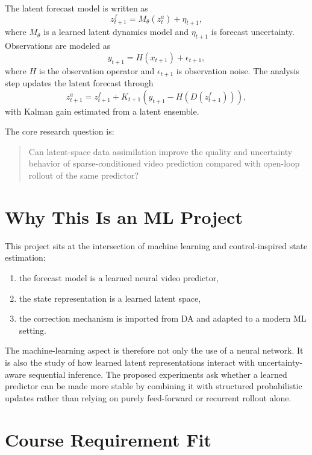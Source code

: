 \documentclass{article}
\begin{document}
The latent forecast model is written as
\begin{equation}
    z_{t+1}^{f} = M_{\theta}(z_t^{a}) + \eta_{t+1},
\end{equation}
where $M_{\theta}$ is a learned latent dynamics model and $\eta_{t+1}$ is forecast uncertainty. Observations are modeled as
\begin{equation}
    y_{t+1} = H(x_{t+1}) + \epsilon_{t+1},
\end{equation}
where $H$ is the observation operator and $\epsilon_{t+1}$ is observation noise. The analysis step updates the latent forecast through
\begin{equation}
    z_{t+1}^{a} = z_{t+1}^{f} + K_{t+1}\left(y_{t+1} - H(D(z_{t+1}^{f}))\right),
\end{equation}
with Kalman gain estimated from a latent ensemble.

The core research question is:
\begin{quote}
Can latent-space data assimilation improve the quality and uncertainty behavior of sparse-conditioned video prediction compared with open-loop rollout of the same predictor?
\end{quote}

\section{Why This Is an ML Project}

This project sits at the intersection of machine learning and control-inspired state estimation:
\begin{enumerate}[leftmargin=1.2em]
    \item the forecast model is a learned neural video predictor,
    \item the state representation is a learned latent space,
    \item the correction mechanism is imported from DA and adapted to a modern ML setting.
\end{enumerate}

The machine-learning aspect is therefore not only the use of a neural network. It is also the study of how learned latent representations interact with uncertainty-aware sequential inference. The proposed experiments ask whether a learned predictor can be made more stable by combining it with structured probabilistic updates rather than relying on purely feed-forward or recurrent rollout alone.

\section{Course Requirement Fit}
\end{document}
